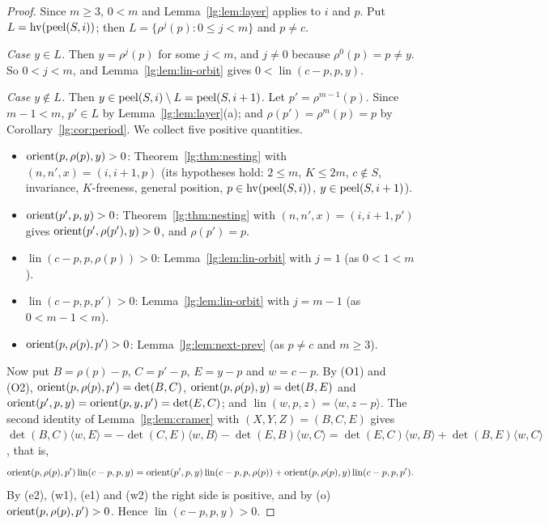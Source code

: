 \begin{proof}
Since $m\ge3$, $0<m$ and Lemma~\ref{lg:lem:layer} applies to $i$ and $p$. Put $L=\operatorname{hv}(\operatorname{peel}(S,i))$; then
$L=\{\rho^{j}(p):0\le j<m\}$ and $p\ne c$.

\emph{Case $y\in L$.} Then $y=\rho^{j}(p)$ for some $j<m$, and $j\ne0$ because $\rho^{0}(p)=p\ne y$. So $0<j<m$, and
Lemma~\ref{lg:lem:lin-orbit} gives $0<\operatorname{lin}(c-p,p,y)$.

\emph{Case $y\notin L$.} Then $y\in\operatorname{peel}(S,i)\setminus L=\operatorname{peel}(S,i+1)$. Let $p'=\rho^{m-1}(p)$. Since $m-1<m$,
$p'\in L$ by Lemma~\ref{lg:lem:layer}(a); and $\rho(p')=\rho^{m}(p)=p$ by Corollary~\ref{lg:cor:period}. We collect
five positive quantities.
\begin{itemize}
\item[(e1)] $\operatorname{orient}(p,\rho(p),y)>0$: Theorem~\ref{lg:thm:nesting} with $(n,n',x)=(i,i+1,p)$ (its hypotheses hold:
  $2\le m$, $K\le2m$, $c\notin S$, invariance, $K$-freeness, general position, $p\in\operatorname{hv}(\operatorname{peel}(S,i))$,
  $y\in\operatorname{peel}(S,i+1)$).
\item[(e2)] $\operatorname{orient}(p',p,y)>0$: Theorem~\ref{lg:thm:nesting} with $(n,n',x)=(i,i+1,p')$ gives
  $\operatorname{orient}(p',\rho(p'),y)>0$, and $\rho(p')=p$.
\item[(w1)] $\operatorname{lin}(c-p,p,\rho(p))>0$: Lemma~\ref{lg:lem:lin-orbit} with $j=1$ (as $0<1<m$).
\item[(w2)] $\operatorname{lin}(c-p,p,p')>0$: Lemma~\ref{lg:lem:lin-orbit} with $j=m-1$ (as $0<m-1<m$).
\item[(o)] $\operatorname{orient}(p,\rho(p),p')>0$: Lemma~\ref{lg:lem:next-prev} (as $p\ne c$ and $m\ge3$).
\end{itemize}
Now put $B=\rho(p)-p$, $C=p'-p$, $E=y-p$ and $w=c-p$. By (O1) and (O2),
$\operatorname{orient}(p,\rho(p),p')=\det(B,C)$, $\operatorname{orient}(p,\rho(p),y)=\det(B,E)$ and $\operatorname{orient}(p',p,y)=\operatorname{orient}(p,y,p')=\det(E,C)$;
and $\operatorname{lin}(w,p,z)=\langle w,z-p\rangle$. The second identity of Lemma~\ref{lg:lem:cramer} with
$(X,Y,Z)=(B,C,E)$ gives $\det(B,C)\langle w,E\rangle=-\det(C,E)\langle w,B\rangle-\det(E,B)\langle w,C\rangle
=\det(E,C)\langle w,B\rangle+\det(B,E)\langle w,C\rangle$, that is,
\begin{equation}\label{lg:eq:key}
  \operatorname{orient}(p,\rho(p),p')\operatorname{lin}(c-p,p,y)
  =\operatorname{orient}(p',p,y)\operatorname{lin}(c-p,p,\rho(p))+\operatorname{orient}(p,\rho(p),y)\operatorname{lin}(c-p,p,p').
\end{equation}
By (e2), (w1), (e1) and (w2) the right side is positive, and by (o) $\operatorname{orient}(p,\rho(p),p')>0$. Hence
$\operatorname{lin}(c-p,p,y)>0$.
\end{proof}

